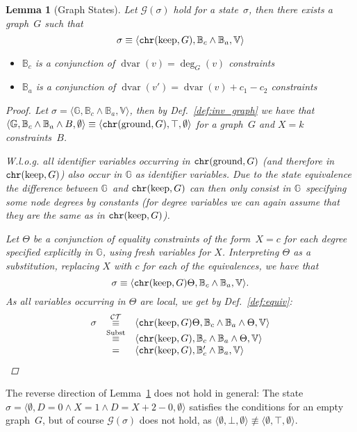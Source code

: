 \documentclass{tlp}
\newtheorem{lemma}[theorem]{Lemma}
\newcommand{\st}[3]{\ensuremath{\langle #1 , #2 , #3 \rangle}}
\newcommand{\CT}{\ensuremath{\mathcal{CT}}}
\newcommand{\mcG}{\ensuremath{\mathcal{G}}}
\newcommand{\bbB}{\ensuremath{\mathbb{B}}}
\newcommand{\bbBca}{\ensuremath{\bbB_c \land \bbB_a}}
\newcommand{\bbG}{\ensuremath{\mathbb{G}}}
\newcommand{\bbV}{\ensuremath{\mathbb{V}}}
\DeclareMathOperator{\dvar}{dvar}
\DeclareMathOperator{\gnd}{ground}
\DeclareMathOperator{\kp}{keep}
\newcommand{\chr}{\ensuremath{{\tt chr}}}
\newcommand{\eqct}{\ensuremath{\stackrel{\CT}{\equiv}}}
\newcommand{\eqsubst}{\ensuremath{\stackrel{\text{Subst}}{\equiv}}}
\begin{document}
\begin{lemma}[Graph States]\label{lem:graph_states} Let $\mcG(\sigma)$ hold for a
state~$\sigma$, then there exists a graph~$G$ such that \[ \sigma \equiv
\st{\chr(\kp, G)}{\bbBca}{\bbV} \]
\begin{itemize}
  \item $\bbB_c$ is a conjunction of $\dvar(v) = \deg_G(v)$ constraints
  \item $\bbB_a$ is a conjunction of $\dvar(v') = \dvar(v){+}c_1{-}c_2$
  constraints
\end{itemize}
\begin{proof}

Let $\sigma = \st{\bbG}{\bbBca}{\bbV}$, then by Def.~\ref{def:inv_graph} we have
that $\st{\bbG}{\bbBca \land B}{\emptyset} \equiv
\st{\chr(\gnd,G)}{\top}{\emptyset}$ for a graph~$G$ and $X=k$ constraints~$B$.

W.l.o.g. all identifier variables occurring in $\chr(\gnd,G)$ (and therefore in
$\chr(\kp,G)$) also occur in $\bbG$ as identifier variables. Due to the state
equivalence the difference between \bbG\ and $\chr(\kp,G)$ can then only consist
in \bbG\ specifying some node degrees by constants (for degree variables we can
again assume that they are the same as in $\chr(\kp,G)$).

Let $\Theta$ be a conjunction of equality constraints of the form~$X=c$ for each
degree specified explicitly in \bbG, using fresh variables for $X$. Interpreting
$\Theta$ as a substitution, replacing $X$ with $c$ for each of the equivalences,
we have that \[ \sigma \equiv \st{\chr(\kp,G) \Theta}{\bbBca}{\bbV}.\] As all
variables occurring in $\Theta$ are local, we get by
Def.~\ref{def:equiv}:\[\begin{array}{lcl}
                       \sigma & \eqct & \st{\chr(\kp,G) \Theta}{\bbBca \land
                       \Theta}{\bbV} \\
                        & \eqsubst & \st{\chr(\kp,G)}{\bbBca \land \Theta}{\bbV}\\
                        & = & \st{\chr(\kp,G)}{\bbB_c' \land \bbB_a}{\bbV}
                        \end{array}\]
\end{proof}
\end{lemma}

The reverse direction of Lemma~\ref{lem:graph_states} does not hold in
general: The state~$\sigma = \st{\emptyset}{D=0 \land X=1 \land
D=X{+}2{-}0}{\emptyset}$ satisfies the conditions for an empty graph~$G$, but of
course $\mcG(\sigma)$ does not hold, as $\st{\emptyset}{\bot}{\emptyset} \not
\equiv \st{\emptyset}{\top}{\emptyset}$.
\end{document}
